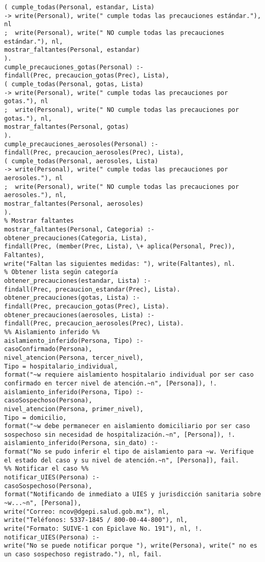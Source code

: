 \documentclass[11pt, letterpaper]{article}
\begin{document}
\begin{verbatim}
( cumple_todas(Personal, estandar, Lista)
-> write(Personal), write(" cumple todas las precauciones estándar."), nl
;  write(Personal), write(" NO cumple todas las precauciones estándar."), nl,
mostrar_faltantes(Personal, estandar)
).
cumple_precauciones_gotas(Personal) :-
findall(Prec, precaucion_gotas(Prec), Lista),
( cumple_todas(Personal, gotas, Lista)
-> write(Personal), write(" cumple todas las precauciones por gotas."), nl
;  write(Personal), write(" NO cumple todas las precauciones por gotas."), nl,
mostrar_faltantes(Personal, gotas)
).
cumple_precauciones_aerosoles(Personal) :-
findall(Prec, precaucion_aerosoles(Prec), Lista),
( cumple_todas(Personal, aerosoles, Lista)
-> write(Personal), write(" cumple todas las precauciones por aerosoles."), nl
;  write(Personal), write(" NO cumple todas las precauciones por aerosoles."), nl,
mostrar_faltantes(Personal, aerosoles)
).
% Mostrar faltantes
mostrar_faltantes(Personal, Categoria) :-
obtener_precauciones(Categoria, Lista),
findall(Prec, (member(Prec, Lista), \+ aplica(Personal, Prec)), Faltantes),
write("Faltan las siguientes medidas: "), write(Faltantes), nl.
% Obtener lista según categoría
obtener_precauciones(estandar, Lista) :-
findall(Prec, precaucion_estandar(Prec), Lista).
obtener_precauciones(gotas, Lista) :-
findall(Prec, precaucion_gotas(Prec), Lista).
obtener_precauciones(aerosoles, Lista) :-
findall(Prec, precaucion_aerosoles(Prec), Lista).
%% Aislamiento inferido %%
aislamiento_inferido(Persona, Tipo) :-
casoConfirmado(Persona),
nivel_atencion(Persona, tercer_nivel),
Tipo = hospitalario_individual,
format("~w requiere aislamiento hospitalario individual por ser caso confirmado en tercer nivel de atención.~n", [Persona]), !.
aislamiento_inferido(Persona, Tipo) :-
casoSospechoso(Persona),
nivel_atencion(Persona, primer_nivel),
Tipo = domicilio,
format("~w debe permanecer en aislamiento domiciliario por ser caso sospechoso sin necesidad de hospitalización.~n", [Persona]), !.
aislamiento_inferido(Persona, sin_dato) :-
format("No se pudo inferir el tipo de aislamiento para ~w. Verifique el estado del caso y su nivel de atención.~n", [Persona]), fail.
%% Notificar el caso %%
notificar_UIES(Persona) :-
casoSospechoso(Persona),
format("Notificando de inmediato a UIES y jurisdicción sanitaria sobre ~w...~n", [Persona]),
write("Correo: ncov@dgepi.salud.gob.mx"), nl,
write("Teléfonos: 5337-1845 / 800-00-44-800"), nl,
write("Formato: SUIVE-1 con Epiclave No. 191"), nl, !.
notificar_UIES(Persona) :-
write("No se puede notificar porque "), write(Persona), write(" no es un caso sospechoso registrado."), nl, fail.

\end{verbatim}
\end{document}

